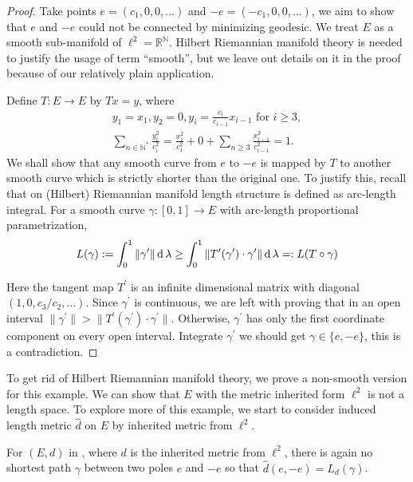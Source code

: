 \begin{proof}
	Take points $e=(c_1, 0,0,\ldots)$ and $-e=(-c_1, 0,0,\ldots)$,
	we aim to show that $e$ and $-e$ could not be connected by minimizing geodesic.
	We treat $E$ as a smooth sub-manifold of $\ell^2 = \mathbb{R}^\mathbb{N}$.
	Hilbert Riemannian manifold theory is needed to justify the usage of term ``smooth'',
	but we leave out details on it in the proof because of our relatively plain application.

	Define \( T: E \rightarrow E \) by \( T x = y \), where
	\begin{gather*}
		y _ { 1 } = x _ { 1 } , y _ { 2 } = 0 , y _ { i } = \frac{c_i}{c_{i-1}} x_{i-1} \text { for } i \geq 3, \\
		\sum_{n \in \mathbb{N}^*} \frac{y_i^2}{c_i^2} = \frac{x_1^2}{c_1^2} + 0 + \sum_{n \geq 3} \frac{x_{i-1}^2}{c_{i-1}^2}=1.
	\end{gather*}
	We shall show that any smooth curve from \( e\) to \( -e \) is mapped by \( T \)
	to another smooth curve which is strictly shorter than the original one.
	To justify this, recall that on (Hilbert) Riemannian manifold length structure is defined as arc-length integral.
	For a smooth curve $\gamma: [0,1] \rightarrow E$ with arc-length proportional parametrization,
	\[
		L(\gamma) := \int_{0}^{1} \| \gamma^\prime \| \operatorname{d} \lambda \geq
		\int_{0}^{1} \| T^\prime(\gamma^\prime) \cdot \gamma^\prime \| \operatorname{d} \lambda =: L(T \circ \gamma)
	\]

	Here the tangent map $T^\prime$ is an infinite dimensional matrix with
	diagonal $(1,0,{c_3}/{c_2}, \ldots)$.
	Since $\gamma^\prime$ is continuous,
	we are left with proving that in an open interval $\| \gamma^\prime \| > \| T^\prime(\gamma^\prime) \cdot \gamma^\prime \|$.
	Otherwise, $\gamma^\prime$ has only the first coordinate component on every open interval.
	Integrate $\gamma^\prime$ we should get $\gamma \in \{ e, -e\}$, this is a contradiction.
\end{proof}

To get rid of Hilbert Riemannian manifold theory,
we prove a non-smooth version for this example.
We can show that $E$ with the metric inherited form $\ell^2$ is not a length space.
To explore more of this example,
we start to consider induced length metric $\hat{d}$ on $E$ by inherited metric from $\ell^2$.

\begin{lem}
	For $(E, d)$ in , where $d$ is the inherited metric from $\ell^2$,
	there is again no shortest path $\gamma$ between two poles $e$ and $-e$
	so that $\hat{d}(e, -e) = L_d (\gamma)$.
\end{lem}

